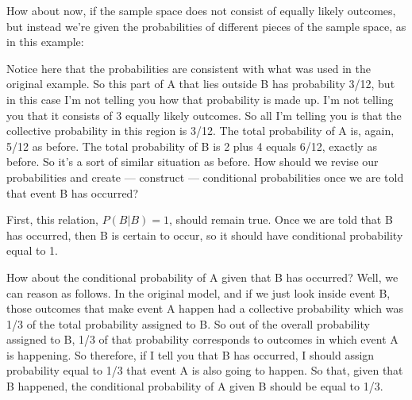 \documentclass[pdftex, brazil, 12pt, twoside]{article}
\begin{document}
How about now, if the sample space does not consist of
equally likely outcomes, but instead we're given the
probabilities of different pieces of the sample space, as
in this example:

\begin{figure}[H]
  \begin{center}
  \end{center}
\end{figure}

Notice here that the probabilities are consistent
with what was used in the original example.
So this part of A that lies outside B has probability
3/12, but in this case I'm not telling you how that
probability is made up.
I'm not telling you that it consists of 3
equally likely outcomes.
So all I'm telling you is that the collective probability in
this region is 3/12.
The total probability of A is, again, 5/12 as before.
The total probability of B is 2 plus 4 equals
6/12, exactly as before.
So it's a sort of similar situation as before.
How should we revise our probabilities and create ---
construct ---
conditional probabilities once we are told
that event B has occurred?

First, this relation, $P(B | B) = 1$, should remain true.
Once we are told that B has occurred, then B is certain to
occur, so it should have conditional
probability equal to 1.

How about the conditional probability of A given that B
has occurred?
Well, we can reason as follows.
In the original model, and if we just look inside event B,
those outcomes that make event A happen had a collective
probability which was 1/3 of the total probability assigned
to B. So out of the overall probability assigned to B, 1/3
of that probability corresponds to outcomes in
which event A is happening.
So therefore, if I tell you that B has occurred, I should
assign probability equal to 1/3 that event A is
also going to happen.
So that, given that B happened, the conditional
probability of A given B should be equal to 1/3.
\end{document}
